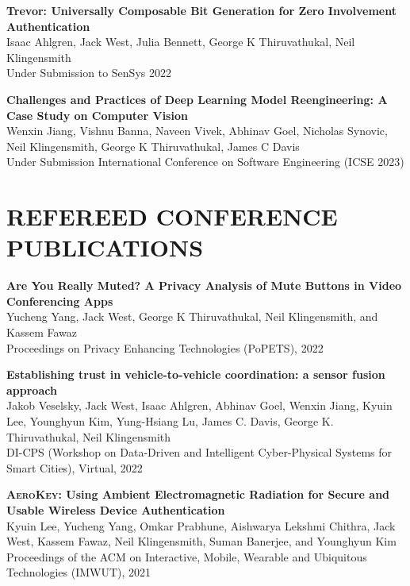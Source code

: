 \documentclass{res}
\begin{document}
\begin{resume}
    {\bf Trevor: Universally Composable Bit Generation for Zero Involvement Authentication} \\
    Isaac Ahlgren, Jack West, Julia Bennett, George K Thiruvathukal,  Neil Klingensmith \\
    Under Submission to SenSys 2022


    {\bf Challenges and Practices of Deep Learning Model Reengineering: A Case Study on Computer Vision} \\
    Wenxin Jiang, Vishnu Banna, Naveen Vivek, Abhinav Goel, Nicholas Synovic, Neil Klingensmith, George K Thiruvathukal, James C Davis \\
    Under Submission International Conference on Software Engineering (ICSE 2023)


\def\labelprefix{C}
\section{REFEREED CONFERENCE PUBLICATIONS}

\begin{etaremune}[leftmargin=0cm,topsep=0pt,itemsep=0pt,partopsep=0pt,parsep=0pt,] 

\item
    \textbf{Are You Really Muted? A Privacy Analysis of Mute Buttons in Video Conferencing Apps} \\
    Yucheng Yang, Jack West, George K Thiruvathukal, Neil Klingensmith, and Kassem Fawaz \\
    Proceedings on Privacy Enhancing Technologies (PoPETS), 2022

\item
    {\bf Establishing trust in vehicle-to-vehicle coordination: a sensor fusion approach} \\
    Jakob Veselsky, Jack West, Isaac Ahlgren, Abhinav Goel, Wenxin Jiang, Kyuin Lee, Younghyun Kim, Yung-Hsiang Lu, James C. Davis, George K. Thiruvathukal, Neil Klingensmith \\
    DI-CPS (Workshop on Data-Driven and Intelligent Cyber-Physical Systems for Smart Cities), Virtual, 2022

\item
    {\bf \textsc{AeroKey}: Using Ambient Electromagnetic Radiation for Secure and Usable Wireless Device Authentication} \\
    Kyuin Lee, Yucheng Yang, Omkar Prabhune, Aishwarya Lekshmi Chithra, Jack West, Kassem Fawaz, Neil Klingensmith, Suman Banerjee, and Younghyun Kim \\
    Proceedings of the ACM on Interactive, Mobile, Wearable and Ubiquitous Technologies (IMWUT), 2021


\end{etaremune}
\end{resume}
\end{document}
